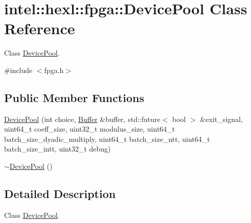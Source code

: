 \hypertarget{classintel_1_1hexl_1_1fpga_1_1DevicePool}{\section{intel\-:\-:hexl\-:\-:fpga\-:\-:Device\-Pool Class Reference}
\label{classintel_1_1hexl_1_1fpga_1_1DevicePool}
}


Class \hyperlink{classintel_1_1hexl_1_1fpga_1_1DevicePool}{Device\-Pool}.  




{\ttfamily \#include $<$fpga.\-h$>$}

\subsection*{Public Member Functions}
\begin{DoxyCompactItemize}
\item 
\hyperlink{classintel_1_1hexl_1_1fpga_1_1DevicePool_a3561da094204c47678f022a2d5ac26ab}{Device\-Pool} (int choice, \hyperlink{classintel_1_1hexl_1_1fpga_1_1Buffer}{Buffer} \&buffer, std\-::future$<$ bool $>$ \&exit\-\_\-signal, uint64\-\_\-t coeff\-\_\-size, uint32\-\_\-t modulus\-\_\-size, uint64\-\_\-t batch\-\_\-size\-\_\-dyadic\-\_\-multiply, uint64\-\_\-t batch\-\_\-size\-\_\-ntt, uint64\-\_\-t batch\-\_\-size\-\_\-intt, uint32\-\_\-t debug)
\item 
\hyperlink{classintel_1_1hexl_1_1fpga_1_1DevicePool_af8404b1e8d112a2bd8c89e980dd69354}{$\sim$\-Device\-Pool} ()
\end{DoxyCompactItemize}


\subsection{Detailed Description}
Class \hyperlink{classintel_1_1hexl_1_1fpga_1_1DevicePool}{Device\-Pool}. 

